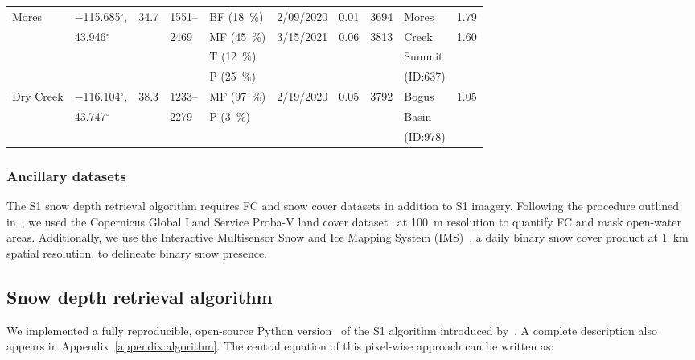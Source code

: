 \documentclass[journal abbreviation, manuscript]{copernicus}
\begin{document}
\begin{table}[t]
\begin{tabular}{llllllllll}
Mores      & $-$115.685$^{\circ}$, & 34.7  & 1551-- & BF (18~\%) & 2/09/2020 & 0.01 & 3694 & Mores   & 1.79 \\
           & 43.946$^{\circ}$     &       & 2469 & MF (45~\%) & 3/15/2021 & 0.06 & 3813 & Creek   & 1.60 \\
           &                      &       &      & T  (12~\%) &           &      &      & Summit  &    \\
           &                      &       &      & P  (25~\%) &           &      &      & (ID:637)&    \\ \hline

Dry Creek  & $-$116.104$^{\circ}$, & 38.3  & 1233-- & MF (97~\%) & 2/19/2020 & 0.05 & 3792 & Bogus    & 1.05 \\
           & 43.747$^{\circ}$     &       & 2279   & P  (3~\%)  &           &      &      & Basin     &    \\
           &                      &       &        &            &           &      &      & (ID:978)  &    \\ \hline

\end{tabular}

\end{table}
\clearpage

\subsubsection{Ancillary datasets}

The S1 snow depth retrieval algorithm requires FC and snow cover datasets in addition to S1 imagery. Following the procedure outlined in~\citet{Lievens.2022}, we used the Copernicus Global Land Service Proba-V land cover dataset~\citep{Buchhorn.2020} at 100~m resolution to quantify FC and mask open-water areas. Additionally, we use the Interactive Multisensor Snow and Ice Mapping System (IMS)~\citep{NSIDC.2008, Helfrick.2007}, a daily binary snow cover product at 1~km spatial resolution, to delineate binary snow presence. 

\subsection{Snow depth retrieval algorithm}\label{S:algorithm}

We implemented a fully reproducible, open-source Python version~\citep{Hoppinen.2023} of the S1 algorithm introduced by~\citet{Lievens.2022}. A complete description also appears in Appendix~\ref{appendix:algorithm}. The central equation of this pixel-wise approach can be written as:
\end{document}
